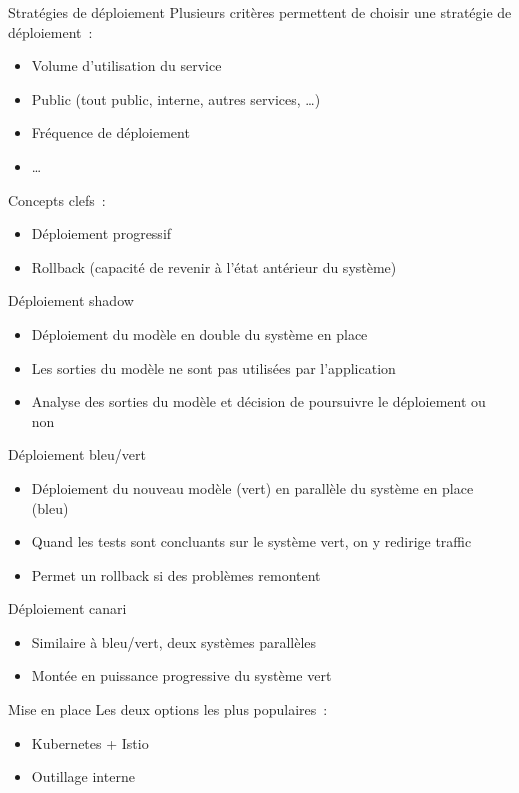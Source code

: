 \begin{frame}{Stratégies de déploiement}
  Plusieurs critères permettent de choisir une stratégie de déploiement~:
  \begin{itemize}
    \item Volume d'utilisation du service
    \item Public (tout public, interne, autres services, …)
    \item Fréquence de déploiement
    \item …
  \end{itemize}

  Concepts clefs~:
  \begin{itemize}
    \item Déploiement progressif
    \item Rollback (capacité de revenir à l'état antérieur du système)
  \end{itemize}
\end{frame}

\begin{frame}{Déploiement shadow}
  \begin{itemize}
    \item Déploiement du modèle en double du système en place
    \item Les sorties du modèle ne sont pas utilisées par l'application
    \item Analyse des sorties du modèle et décision de poursuivre le déploiement ou non
  \end{itemize}
\end{frame}

\begin{frame}{Déploiement bleu/vert}
  \begin{itemize}
    \item Déploiement du nouveau modèle (vert) en parallèle du système en place (bleu)
    \item Quand les tests sont concluants sur le système vert, on y redirige traffic
    \item Permet un rollback si des problèmes remontent
  \end{itemize}
\end{frame}

\begin{frame}{Déploiement canari}
  \begin{itemize}
    \item Similaire à bleu/vert, deux systèmes parallèles
    \item Montée en puissance progressive du système vert
  \end{itemize}
\end{frame}

\begin{frame}{Mise en place}
  Les deux options les plus populaires~:
  \begin{itemize}
    \item Kubernetes + Istio
    \item Outillage interne
  \end{itemize}
\end{frame}
